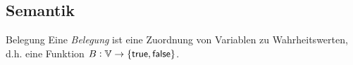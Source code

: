 

\subsection{Semantik}
\begin{comment}
Wir wollen jeder aussagenlogischen Formel nun eine Bedeutung zuordnen. Am bequemsten wäre es, wenn wir jeder Formel
direkt einen der Wahrheitswert \textit{wahr} oder \textit{falsch} zuordnen könnten. Bei
einigen Formeln gelingt dies tatsächlich ohne
Probleme; $\neg p\lor p$ beispielsweise ist immer wahr, egal ob $p$ selbst wahr oder falsch ist. Für andere Formeln ist das aber
weniger klar; der Wahrheitswert der Formel $p_1\lor p_4$ hängt von den Wahrheitswerten der Formeln $p_1$ und $p_4$ ab. Wir haben also folgendes Problem:
\begin{itemize}
\item Bevor wir die Wahrheitswerte von komplizierten Formeln bestimmen/definieren können, müssen wir die Wahrheitswerte der atomaren Formeln schon bestimmt haben.
\item Die Zuordnung von Wahrheitswerten zu atomaren Formeln ist völlig willkürlich; es gibt keinen Grund, dass beispielsweise die Formel $p_1$ ``weniger wahr'' als die Formel $p_4$ sein soll.
\end{itemize}


Wir können einer aussagenlogischen Formel nur einen Wahrheitswert
\textit{bezüglich} einer Belegung der atomaren Formeln mit Wahrheitswerten geben.
Zum Beispiel, wenn wir die Variablen $p_1$ und $p_4$ beide mit dem Wahrheitswert $\false$
belegen, dann hat die Formel $p_1\lor p_4$ \textit{unter dieser Belegung} ebenfalls den
Wahrheitswert $\false$.
\end{comment}

\begin{definition}{Belegung}
Eine \textit{Belegung} ist eine Zuordnung von Variablen zu Wahrheitswerten, d.h.
eine  Funktion $B:\mathbb{V}\to \{\mathsf{true},\mathsf{false}\}$.
\end{definition}
\begin{comment}
Nun werden wir sehen, wie man ausgehend von einer Belegung jeder aussagenlogischen Formel einen Wahrheitswert zuordnen
kann. Bevor wir uns der formalen Definition widmen, skizzieren wir unser Vorgehen exemplarisch an der Formel $(p\lor q)\land
\neg p$. Nehmen wir an, dass $B$ eine Belegung mit $B(p)=\true$ und $B(q)=\false$ sei.
Wir wollen
nun den Wahrheitswert von $(p\lor q)\land \neg p$ sinnvoll definieren. Wegen $B(p)=\true$
sollte die Formel $\neg p$ den Wahrheitswert $\false$ haben, und die Formel $p\lor q$ den
Wert
$\true$ erhalten. Zusammenfassend sehen wir, dass die Formel $\underbrace{(p\lor
q)}_{X}\land \underbrace{\neg p}_{Y}$ von der Form $X\land Y$ ist wobei $X$ den
Wahrheitswert $\true$ und $Y$ den Wahrheitswert $\false$ hat. Es ist daher sinnvoll den
Wahrheitswert von $(p\lor q)\land \neg p$ auf $\false$ zu setzen.
Nun zur formalen Definition
\end{comment}

